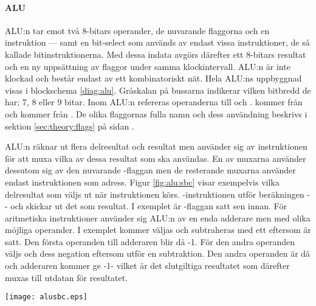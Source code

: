 \documentclass[main.tex]{subfiles}
\begin{document}
\paragraph{ALU}
ALU:n tar emot två 8-bitars operander, de nuvarande flaggorna och en
instruktion --- samt en bit-select som används av endast vissa instruktioner,
de så kallade bitinstruktionerna. Med dessa indata avgörs därefter ett 8-bitars
resultat och en ny uppsättning av flaggor under samma klockintervall. ALU:n är
inte klockad och består endast av ett kombinatoriskt nät. Hela ALU:ns
uppbyggnad visas i blockschema \ref{diag:alu}. Gråskalan på bussarna indikerar
vilken bitbredd de har; 7, 8 eller 9 bitar. Inom ALU:n refereras operanderna
till  och .  kommer från  och
 kommer från . De olika flaggornas fulla namn och dess
användning beskrivs i sektion \ref{sec:theory:flags} på sidan
\pageref{sec:theory:flags}.

ALU:n räknar ut flera delresultat och resultat men använder sig av
instruktionen för att muxa vilka av dessa resultat som ska användas. En av
muxarna använder dessutom sig av den nuvarande -flaggan men de
resterande muxarna använder endast instruktionen som adress. Figur
\ref{fig:alu:sbc} visar exempelvis vilka delresultat som väljs ut när
instruktionen  körs. -instruktionen utför beräkningen
-- och skickar ut det som resultat. I exemplet är
-flaggan satt sen innan. För aritmetiska instruktioner använder sig
ALU:n av en enda adderare men med olika möjliga operander. I exemplet kommer
 väljas och subtraheras med ett eftersom  är satt. Den första
operanden till adderaren blir då -1. För den andra operanden väljs
 och dess negation eftersom  utför en subtraktion. Den
andra operanden är då  och adderaren kommer ge
-1- vilket är det slutgiltiga resultatet som därefter muxas
till utdatan för resultatet.

\begin{SCfigure}
    \centering
    \texttt{[image: alusbc.eps]}
    \caption{Resultat och delresultat som muxas då -instruktionen
    utförs och -flaggan är satt.}
    \label{fig:alu:sbc}
\end{SCfigure}

\clearpage
\end{document}
